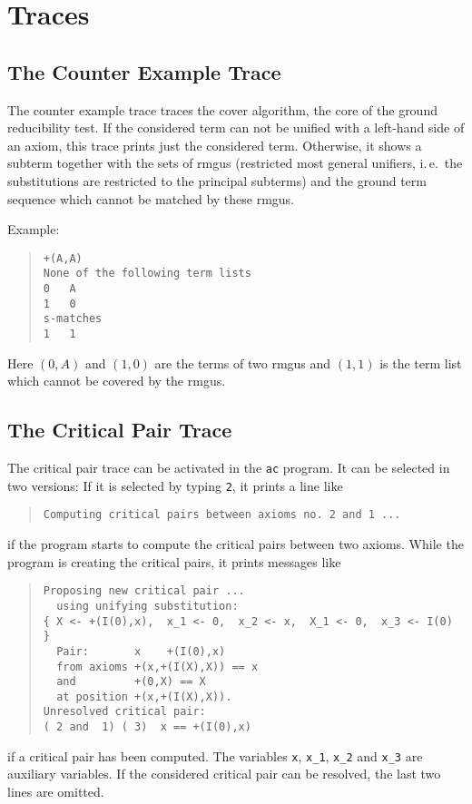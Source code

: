 \section{Traces}
\label{Traces}
\subsection{The Counter Example Trace}
The counter example trace traces the cover algorithm, the core of the
ground reducibility test.
If the considered term can not be unified with a left-hand side of an
axiom, this trace prints just the considered term.
Otherwise, it shows a subterm together with the sets of
rmgus (restricted most general unifiers, i.\,e.\  the substitutions are
restricted to the principal subterms) and the ground term sequence
which cannot be matched by these rmgus.

\noindent
Example:
\begin{quote}   
\begin{verbatim}
+(A,A)
None of the following term lists
0   A   
1   0   
s-matches
1   1   
\end{verbatim}
\end{quote}
Here $(0,A)$ and $(1,0)$ are the terms of two rmgus and $(1,1)$ is the
term list which cannot be covered by the rmgus.

\subsection{The Critical Pair Trace}
The critical pair trace can be activated in the {\tt ac} program.
It can be selected in two versions:
If it is selected by typing {\tt 2}, it prints a line like 
\begin{quote}
\begin{verbatim}
Computing critical pairs between axioms no. 2 and 1 ...
\end{verbatim}
\end{quote}
if the program starts to compute the critical pairs between two axioms.
While the program is creating the critical pairs, it prints messages like 
\begin{quote}
\begin{verbatim}
Proposing new critical pair ...
  using unifying substitution:
{ X <- +(I(0),x),  x_1 <- 0,  x_2 <- x,  X_1 <- 0,  x_3 <- I(0) }
  Pair:       x    +(I(0),x)
  from axioms +(x,+(I(X),X)) == x
  and         +(0,X) == X
  at position +(x,+(I(X),X)).
Unresolved critical pair: 
( 2 and  1) ( 3)  x == +(I(0),x)
\end{verbatim}
\end{quote}
if a critical pair has been computed. 
The variables \verb/x/, \verb/x_1/, \verb/x_2/ and \verb/x_3/ are
auxiliary variables. 
If the considered critical pair
can be resolved, the last two lines are omitted.

